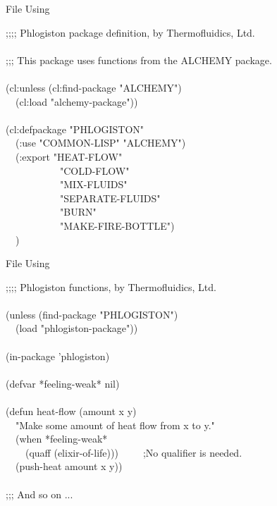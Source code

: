 {\newpage
\clearpage
\samepage \begin{table}%
[t]
\caption{File \protect{} Using \protect{}}
\label{DEFPACKAGE-PHLOGISTON-PACKAGE-TABLE}
\begin{lisp}
;;;; Phlogiston package definition, by Thermofluidics, Ltd. \\ 
 \\ 
;;; This package uses functions from the ALCHEMY package. \\ 
 \\ 
(cl:unless (cl:find-package "ALCHEMY") \\ 
~~(cl:load "alchemy-package")) \\ 
 \\ 
(cl:defpackage "PHLOGISTON" \\ 
~~(:use "COMMON-LISP" "ALCHEMY") \\ 
~~(:export "HEAT-FLOW" \\ 
~~~~~~~~~~~"COLD-FLOW" \\ 
~~~~~~~~~~~"MIX-FLUIDS" \\ 
~~~~~~~~~~~"SEPARATE-FLUIDS" \\ 
~~~~~~~~~~~"BURN" \\ 
~~~~~~~~~~~"MAKE-FIRE-BOTTLE") \\ 
~~)
\end{lisp}
\end{table}
}

{\newpage
\clearpage
\samepage \begin{table}%
[b]
\caption{File \protect{} Using \protect{}}
\label{DEFPACKAGE-PHLOGISTON-FILE-TABLE}
\begin{lisp}
;;;; Phlogiston functions, by Thermofluidics, Ltd. \\ 
 \\ 
(unless (find-package "PHLOGISTON") \\ 
~~(load "phlogiston-package")) \\ 
 \\ 
(in-package 'phlogiston) \\ 
\\ 
(defvar *feeling-weak* nil) \\ 
\\ 
(defun heat-flow (amount x y) \\ 
~~"Make some amount of heat flow from x to y." \\ 
~~(when *feeling-weak* \\ 
~~~~(quaff (elixir-of-life)))~~~~~;No qualifier is needed. \\ 
~~(push-heat amount x y)) \\ 
 \\ 
;;; And so on ...
\end{lisp}
\end{table}
}

